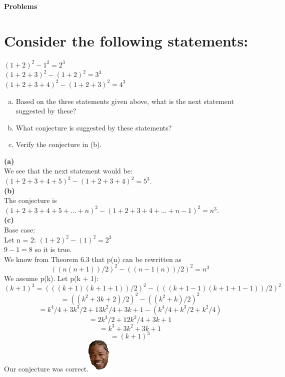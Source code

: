 \textbf{\Huge Problems}
\section{Consider the following statements:}
$(1+2)^2-1^2=2^3$\\
$(1+2+3)^2-(1+2)^2=3^3$\\
$(1+2+3+4)^2-(1+2+3)^2=4^3$\\
\begin{enumerate}[(a)]
\item Based on the three statements given above, what is the next statement suggested by these?
\item What conjecture is suggested by these statements?
\item Verify the conjecture in (b).
\end{enumerate}
\textbf{\Large(a)}\\
We see that the next statement would be: $(1+2+3+4+5)^2-(1+2+3+4)^2=5^3$.\\
\textbf{\Large(b)}\\
The conjecture is $(1+2+3+4+5+...+n)^2-(1+2+3+4+...+n-1)^2=n^3$.\\
\textbf{\Large(c)}\\
Base case:\\
Let n = 2: $(1+2)^2-(1)^2 = 2^3$\\
$9-1 = 8$ so it is true.\\
We know from Theorem 6.3 that p(n) can be rewritten as
\begin{equation}
((n(n+1))/2)^2 - ((n-1(n))/2)^2 = n^3
\end{equation}
We assume p(k).
Let p(k + 1):\\
\begin{equation}
(k+1)^3 = (((k+1)(k+1+1))/2)^2 - (((k+1-1)(k+1+1-1))/2)^2 
\end{equation}
\begin{equation}
 = ((k^2+3k+2)/2)^2 - ((k^2+k)/2)^2 
\end{equation}
\begin{equation}
 = k^4/4 + 3k^3/2 + 13k^2/4 + 3k + 1 - (k^4/4 + k^3/2 + k^2/4)
\end{equation}
\begin{equation}
 = 2k^3/2 + 12k^2/4 + 3k + 1
\end{equation}
\begin{equation}
 = k^3 + 3k^2 + 3k + 1
\end{equation}
\begin{equation}
 = (k+1)^3
\end{equation}
Our conjecture was correct.\includegraphics[scale=0.70]{billeder/xzibit}


